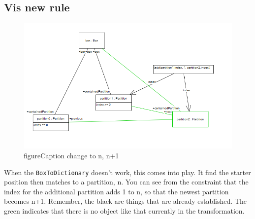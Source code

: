 \newpage
\subsection{Vis new rule}
\visHeader

\begin{figure}[htp]
\begin{center}
  \includegraphics[width=\textwidth]{allOtherCardsRule}
  \caption{figureCaption \update change to n, n+1}
  \label{fig:allOtherCardsRule}
\end{center}
\end{figure}

When the \texttt{BoxToDictionary} doesn't work, this comes into play. It find the starter position then matches to a partition, n. You can see from the
constraint that the index for the additional partition adds 1 to n, so that the newest partition becomes n+1. Remember, the black are things that are already
established. The green indicates that there is no object like that currently in the transformation.